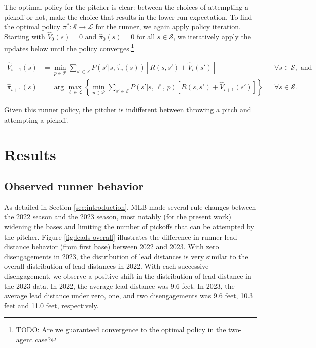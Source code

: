 \documentclass{article}
\begin{document}
        The optimal policy for the pitcher is clear: between the choices of attempting a pickoff or not, make the choice that results in the lower run expectation. To find the optimal policy $\pi^* : \mathcal{S} \rightarrow \mathcal{L}$ for the runner, we again apply policy iteration. Starting with $\hat V_0(s) = 0$ and $\hat \pi_0(s) = 0$ for all $s \in \mathcal{S}$, we iteratively apply the updates below until the policy converges.\footnote{TODO: Are we guaranteed convergence to the optimal policy in the two-agent case?}
        
        \begin{align}
          \label{eqn:update-value-two-agent}
          \hat V_{i+1}(s) &= \min_{p \in \mathcal{P}} \sum_{s' \in \mathcal{S}} P(s' | s,\, \hat\pi_i(s)) [R(s, s') + \hat V_i(s')] && \forall s \in \mathcal{S}, \mbox{ and}\\
          \label{eqn:update-policy-two-agent}
          \hat\pi_{i+1}(s) &= \arg\max_{\ell \in \mathcal{L}} \left\{\min_{p \in \mathcal{P}}\sum_{s' \in \mathcal{S}} P(s' | s,\, \ell,\, p) [R(s, s') + \hat V_{i+1}(s')]\right\} && \forall s \in \mathcal{S}.
        \end{align}

        Given this runner policy, the pitcher is indifferent between throwing a pitch and attempting a pickoff.

  \section{Results}
  
    \subsection{Observed runner behavior}

      As detailed in Section \ref{sec:introduction}, MLB made several rule changes between the 2022 season and the 2023 season, most notably (for the present work) widening the bases and limiting the number of pickoffs that can be attempted by the pitcher. Figure \ref{fig:leads-overall} illustrates the difference in runner lead distance behavior (from first base) between 2022 and 2023. With zero disengagements in 2023, the distribution of lead distances is very similar to the overall distribution of lead distances in 2022. With each successive disengagement, we observe a positive shift in the distribution of lead distance in the 2023 data. In 2022, the average lead distance was 9.6 feet. In 2023, the average lead distance under zero, one, and two disengagements was 9.6 feet, 10.3 feet and 11.0 feet, respectively.
 
\end{document}
